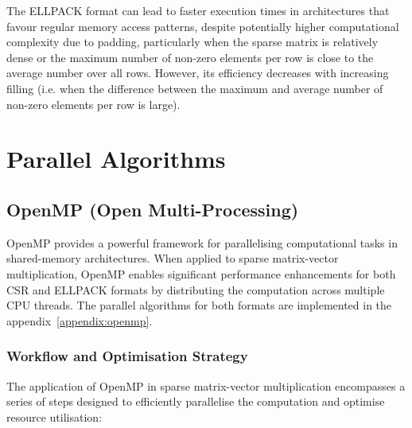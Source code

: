 \documentclass[12pt,oneside]{book} %
\begin{document}
The ELLPACK format can lead to faster execution times in architectures that
favour regular memory access patterns, despite potentially higher computational
complexity due to padding, particularly when the sparse matrix is relatively
dense or the maximum number of non-zero elements per row is close to the
average number over all rows. However, its efficiency decreases with increasing
filling (i.e. when the difference between the maximum and average number of
non-zero elements per row is large).

\newpage
\section{Parallel Algorithms}
\subsection{OpenMP (Open Multi-Processing)}

OpenMP provides a powerful framework for parallelising computational tasks in
shared-memory architectures. When applied to sparse matrix-vector
multiplication, OpenMP enables significant performance enhancements for both
CSR and ELLPACK formats by distributing the computation across multiple CPU
threads. The parallel algorithms for both formats are implemented in the
appendix~\ref{appendix:openmp}.

\subsubsection{Workflow and Optimisation Strategy}

The application of OpenMP in sparse matrix-vector multiplication encompasses a
series of steps designed to efficiently parallelise the computation and
optimise resource utilisation:
\end{document}

